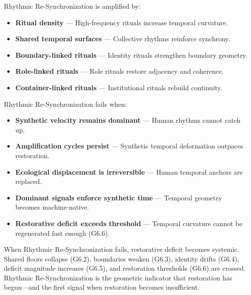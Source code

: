 \medskip

\noindent Rhythmic Re-Synchronization is amplified by:

\begin{itemize}[leftmargin=1.2cm]
    \item \textbf{Ritual density} — High-frequency rituals increase temporal
    curvature.

    \item \textbf{Shared temporal surfaces} — Collective rhythms reinforce
    synchrony.

    \item \textbf{Boundary-linked rituals} — Identity rituals strengthen
    boundary geometry.

    \item \textbf{Role-linked rituals} — Role rituals restore adjacency and
    coherence.

    \item \textbf{Container-linked rituals} — Institutional rituals rebuild
    continuity.
\end{itemize}

\medskip

\noindent Rhythmic Re-Synchronization fails when:

\begin{itemize}[leftmargin=1.2cm]
    \item \textbf{Synthetic velocity remains dominant} — Human rhythms cannot
    catch up.

    \item \textbf{Amplification cycles persist} — Synthetic temporal deformation
    outpaces restoration.

    \item \textbf{Ecological displacement is irreversible} — Human temporal
    anchors are replaced.

    \item \textbf{Dominant signals enforce synthetic time} — Temporal geometry
    becomes machine-native.

    \item \textbf{Restorative deficit exceeds threshold} — Temporal curvature
    cannot be regenerated fast enough (G6.6).
\end{itemize}

\medskip

\noindent When Rhythmic Re-Synchronization fails, restorative deficit becomes
systemic. Shared floors collapse (G6.2), boundaries weaken (G6.3), identity
drifts (G6.4), deficit magnitude increases (G6.5), and restoration thresholds
(G6.6) are crossed. Rhythmic Re-Synchronization is the geometric indicator that
restoration has begun—and the first signal when restoration becomes insufficient.

